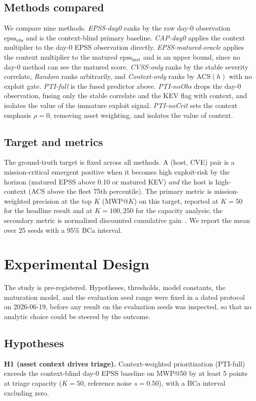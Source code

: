 \documentclass[journal]{IEEEtran}
\begin{document}
\subsection{Methods compared}
We compare nine methods. \emph{EPSS-day0} ranks by the raw day-0 observation $\mathrm{epss_{obs}}$
and is the context-blind primary baseline. \emph{CAP-day0} applies the context multiplier to the
day-0 EPSS observation directly. \emph{EPSS-matured-oracle} applies the context multiplier to the
matured $\mathrm{epss_{mat}}$ and is an upper bound, since no day-0 method can see the matured score.
\emph{CVSS-only} ranks by the stable severity correlate, \emph{Random} ranks arbitrarily, and
\emph{Context-only} ranks by $\mathrm{ACS}(h)$ with no exploit gate. \emph{PTI-full} is the fused
predictor above. \emph{PTI-noObs} drops the day-0 observation, fusing only the stable correlate and
the KEV flag with context, and isolates the value of the immature exploit signal. \emph{PTI-noCrit}
sets the context emphasis $\rho = 0$, removing asset weighting, and isolates the value of context.

\subsection{Target and metrics}
The ground-truth target is fixed across all methods. A (host, CVE) pair is a mission-critical
emergent positive when it becomes high exploit-risk by the horizon (matured EPSS above 0.10 or
matured KEV) \emph{and} the host is high-context (ACS above the fleet 75th percentile). The primary
metric is mission-weighted precision at the top $K$ (MWP@$K$) on this target, reported at $K = 50$
for the headline result and at $K = 100, 250$ for the capacity analysis; the secondary metric is
normalized discounted cumulative gain~\cite{jarvelin2002ndcg}. We report the mean over 25 seeds with
a 95\% BCa interval.

\section{Experimental Design}
The study is pre-registered. Hypotheses, thresholds, model constants, the maturation model, and the
evaluation seed range were fixed in a dated protocol on 2026-06-19, before any result on the
evaluation seeds was inspected, so that no analytic choice could be steered by the outcome.

\subsection{Hypotheses}
\textbf{H1 (asset context drives triage).} Context-weighted prioritization (PTI-full) exceeds the
context-blind day-0 EPSS baseline on MWP@50 by at least 5 points at triage capacity ($K = 50$,
reference noise $s = 0.50$), with a BCa interval excluding zero.
\end{document}
